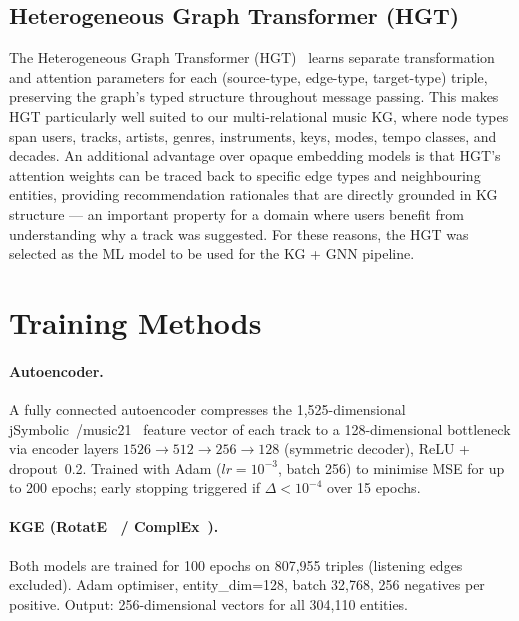 \documentclass[10pt,twocolumn,letterpaper]{article}
\begin{document}
\subsection{Heterogeneous Graph Transformer (HGT)}

The Heterogeneous Graph Transformer (HGT)~\cite{hu2020hgt} learns separate transformation and attention parameters for each (source-type, edge-type, target-type) triple, preserving the graph's typed structure throughout message passing. This makes HGT particularly well suited to our multi-relational music KG, where node types span users, tracks, artists, genres, instruments, keys, modes, tempo classes, and decades. An additional advantage over opaque embedding models is that HGT's attention weights can be traced back to specific edge types and neighbouring entities, providing recommendation rationales that are directly grounded in KG structure — an important property for a domain where users benefit from understanding why a track was suggested. For these reasons, the HGT was selected as the ML model to be used for the KG + GNN pipeline.

\section{Training Methods}
\label{sec:training}

\paragraph{Autoencoder.}
A fully connected autoencoder compresses the 1,525-dimensional jSymbolic~\cite{mckay2018jsymbolic}/music21~\cite{music21docs} feature vector of each track to a 128-dimensional bottleneck via encoder layers $1526\!\to\!512\!\to\!256\!\to\!128$ (symmetric decoder), ReLU + dropout~0.2. Trained with Adam ($lr{=}10^{-3}$, batch 256) to minimise MSE for up to 200 epochs; early stopping triggered if $\Delta{<}10^{-4}$ over 15 epochs.

\paragraph{KGE (RotatE~\cite{sun2019rotate} / ComplEx~\cite{trouillon2016complex}).}
Both models are trained for 100 epochs on 807,955 triples (listening edges excluded). Adam optimiser, entity\_dim=128, batch 32,768, 256 negatives per positive. Output: 256-dimensional vectors for all 304,110 entities.
\end{document}
